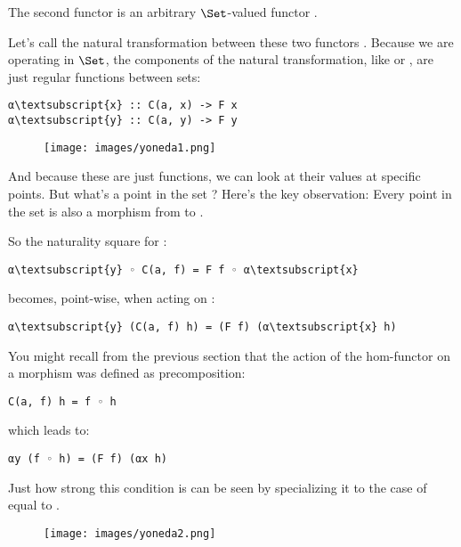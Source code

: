 The second functor is an arbitrary $\Set$-valued functor
.

Let's call the natural transformation between these two functors
. Because we are operating in $\Set$, the components of
the natural transformation, like  or , are just
regular functions between sets:

\begin{Verbatim}[commandchars=\\\{\}]
α\textsubscript{x} :: C(a, x) -> F x
α\textsubscript{y} :: C(a, y) -> F y
\end{Verbatim}

\begin{figure}[H]
\centering
\texttt{[image: images/yoneda1.png]}
\end{figure}

\noindent
And because these are just functions, we can look at their values at
specific points. But what's a point in the set ? Here's
the key observation: Every point in the set  is also a
morphism  from  to .

So the naturality square for :

\begin{Verbatim}[commandchars=\\\{\}]
α\textsubscript{y} ◦ C(a, f) = F f ◦ α\textsubscript{x}
\end{Verbatim}
becomes, point-wise, when acting on :

\begin{Verbatim}[commandchars=\\\{\}]
α\textsubscript{y} (C(a, f) h) = (F f) (α\textsubscript{x} h)
\end{Verbatim}
You might recall from the previous section that the action of the
hom-functor  on a morphism  was defined as
precomposition:

\begin{Verbatim}[commandchars=\\\{\}]
C(a, f) h = f ◦ h
\end{Verbatim}
which leads to:

\begin{Verbatim}[commandchars=\\\{\}]
αy (f ◦ h) = (F f) (αx h)
\end{Verbatim}
Just how strong this condition is can be seen by specializing it to the
case of  equal to .

\begin{figure}[H]
\centering
\texttt{[image: images/yoneda2.png]}
\end{figure}


